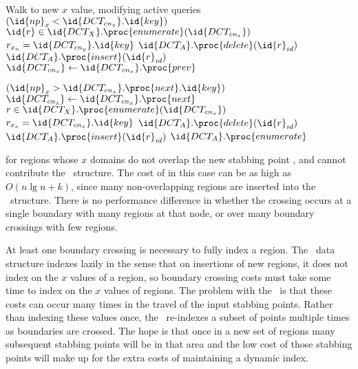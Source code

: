 \documentclass{stdbm}
\newcommand{\ct}{\id{DCT}}
\newcommand{\meth}{.}
\newcommand{\inC}[1]{{\id{DCT_{#1}}}}
\newcommand{\X}{{\inC{X}}}
\newcommand{\A}{{\inC{A}}}
\newcommand{\cnx}{{\inC{cn_x}}}
\newcommand{\cny}{{\inC{cn_y}}}
\begin{document}
\begin{algorithm}[htbp]
\begin{codebox}
                     \End
       \End
   \End                                     \label{li:report-y-loop-end}
\li \Comment Walk to new $x$ value, modifying active queries
\li \While $(\id{np}_x < \cnx \meth \id{key})$ \label{li:report-x-loop-begin}
\li   \Do {} $\id{r} \in \X \meth \proc{enumerate}(\cnx)$
\li       \If $r_{x_n} = \cny \meth \id{key}$
\li            \Then $\A \meth \proc{delete}(\id{r}_{id})$
\li            \Else $\A \meth \proc{insert}(\id{r}_{id})$
            \End
\li     $\cnx \gets \cnx \meth \proc{prev}$ \label{li:report-break}
   \End

\li \While $(\id{np}_x > \cnx \meth \proc{next} \meth \id{key})$
\li   \Do $\cnx \gets \cnx \meth \proc{next}$
\li     {} $r \in \X \meth \proc{enumerate}(\cnx)$
\li       \If $r_{x_x} = \cnx \meth \id{key}$
\li            \Then $\A \meth \proc{delete}(\id{r}_{id})$
\li            \Else $\A \meth \proc{insert}(\id{r}_{id})$
            \End
   \End \label{li:report-x-loop-end}
\li \Return $\A \meth \proc{enumerate}$ \label{li:report-return}
\End
\end{codebox}  
\end{algorithm}
for regions whose $x$ domains do not overlap the new stabbing point
, and cannot contribute the \A\ structure.  The cost of
 in this case can be as high as $O(n\lg{n} + k)$,
since many non-overlapping regions are inserted into the \X\ 
structure.  There is no performance difference in whether the crossing
occurs at a single boundary with many regions at that node, or over
many boundary crossings with few regions.

At least one boundary crossing is necessary to fully index a region.
The \id{DCT}\ data structure indexes lazily in the sense that on
insertions of new regions, it does not index on the $x$ values of a
region, so boundary crossing costs must take some time to index on the
$x$ values of regions.  The problem with the \ct\ is that these costs
can occur many times in the travel of the input stabbing points.
Rather than indexing these values once, the \ct\ re-indexes a subset of
points multiple times as boundaries are crossed.  The hope is that
once in a new set of regions many subsequent stabbing points will be
in that area and the low cost of those stabbing points will make up
for the extra costs of maintaining a dynamic index.
\end{document}
